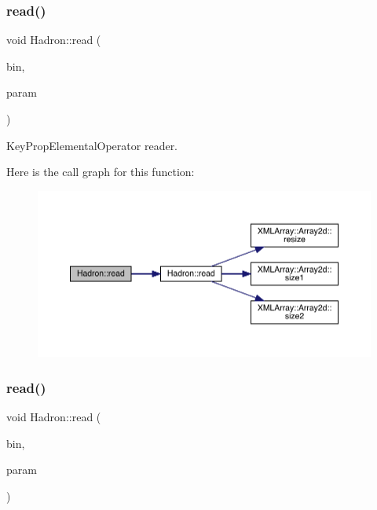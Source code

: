 \subsubsection{\texorpdfstring{read()}{read()}\hspace{0.1cm}{\footnotesize\ttfamily [24/94]}}
{\footnotesize\ttfamily void Hadron\+::read (\begin{DoxyParamCaption}\item[{\mbox{\hyperlink{classADATIO_1_1BinaryReader}{Binary\+Reader}} \&}]{bin,  }\item[{\mbox{\hyperlink{structHadron_1_1KeyPropElementalOperator__t}{Key\+Prop\+Elemental\+Operator\+\_\+t}} \&}]{param }\end{DoxyParamCaption})}



Key\+Prop\+Elemental\+Operator reader. 

Here is the call graph for this function\+:
\nopagebreak
\begin{figure}[H]
\begin{center}
\leavevmode
\includegraphics[width=350pt]{d1/daf/namespaceHadron_ac7fbe05fdb59de181eed9428364667e3_cgraph}
\end{center}
\end{figure}
\mbox{\label{namespaceHadron_a0fa916d0de711ad2cf389173ad463f51}} 
\subsubsection{\texorpdfstring{read()}{read()}\hspace{0.1cm}{\footnotesize\ttfamily [25/94]}}
{\footnotesize\ttfamily void Hadron\+::read (\begin{DoxyParamCaption}\item[{\mbox{\hyperlink{classADATIO_1_1BinaryReader}{Binary\+Reader}} \&}]{bin,  }\item[{\mbox{\hyperlink{structHadron_1_1KeyCGCIrrepMom__t}{Key\+C\+G\+C\+Irrep\+Mom\+\_\+t}} \&}]{param }\end{DoxyParamCaption})}



